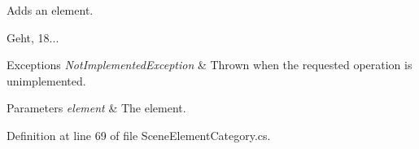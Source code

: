 Adds an element. 

Geht, 18... 


\begin{DoxyExceptions}{Exceptions}
{\em Not\-Implemented\-Exception} & Thrown when the requested operation is unimplemented. \\
\hline
\end{DoxyExceptions}



\begin{DoxyParams}{Parameters}
{\em element} & The element. \\
\hline
\end{DoxyParams}


Definition at line 69 of file Scene\-Element\-Category.\-cs.

